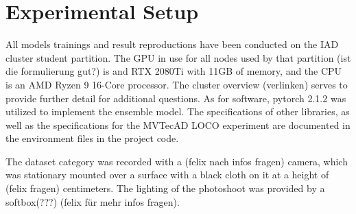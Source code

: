 \chapter{Experimental Setup}
\label{chap:experimentsetup}

All models trainings and result reproductions have been conducted on the IAD cluster student partition. The GPU in use for all nodes used by that partition (ist die formulierung gut?) is and 
RTX 2080Ti with 11GB of memory, and the CPU is an AMD Ryzen 9 16-Core processor. The cluster overview (verlinken) serves to provide further detail for additional questions. As for software, 
pytorch 2.1.2 was utilized to implement the ensemble model. The specifications of other libraries, as well as the specifications for the MVTecAD LOCO experiment are documented in the 
environment files in the project code.

The dataset category was recorded with a (felix nach infos fragen) camera, which was stationary mounted over a surface with a black cloth on it at a height of (felix fragen) centimeters. 
The lighting of the photoshoot was provided by a softbox(???) (felix für mehr infos fragen).





